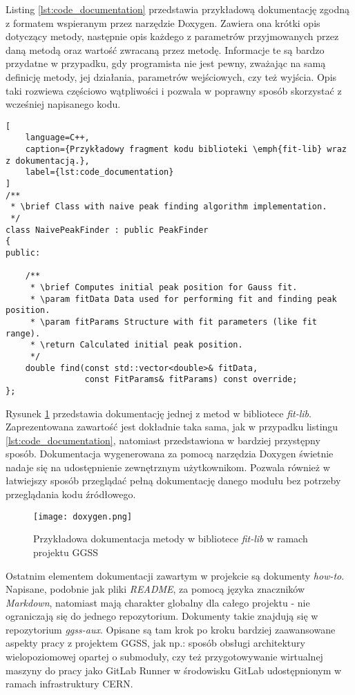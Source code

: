 Listing \ref{lst:code_documentation} przedstawia przykładową dokumentację zgodną z formatem wspieranym przez narzędzie Doxygen. Zawiera ona krótki opis dotyczący metody, następnie opis każdego z parametrów przyjmowanych przez daną metodą oraz wartość zwracaną przez metodę. Informacje te są bardzo przydatne w przypadku, gdy programista nie jest pewny, zważając na samą definicję metody, jej działania, parametrów wejściowych, czy też wyjścia. Opis taki rozwiewa częściowo wątpliwości i pozwala w poprawny sposób skorzystać z wcześniej napisanego kodu.

\begin{lstlisting}[
    language=C++,
    caption={Przykładowy fragment kodu biblioteki \emph{fit-lib} wraz z dokumentacją.},
    label={lst:code_documentation}
]
/**
 * \brief Class with naive peak finding algorithm implementation.
 */
class NaivePeakFinder : public PeakFinder
{
public:

    /**
     * \brief Computes initial peak position for Gauss fit.
     * \param fitData Data used for performing fit and finding peak position.
     * \param fitParams Structure with fit parameters (like fit range).
     * \return Calculated initial peak position.
     */
    double find(const std::vector<double>& fitData,
                const FitParams& fitParams) const override;
};
\end{lstlisting}

Rysunek \ref{fig:doxygen} przedstawia dokumentację jednej z metod w bibliotece \emph{fit-lib}. Zaprezentowana zawartość jest dokładnie taka sama, jak w przypadku listingu \ref{lst:code_documentation}, natomiast przedstawiona w bardziej przystępny sposób. Dokumentacja wygenerowana za pomocą narzędzia Doxygen świetnie nadaje się na udostępnienie zewnętrznym użytkownikom. Pozwala również w łatwiejszy sposób przeglądać pełną dokumentację danego modułu bez potrzeby przeglądania kodu źródłowego.

\begin{figure}[H]
    \centering
    \texttt{[image: doxygen.png]}
    \caption{Przykładowa dokumentacja metody w bibliotece \emph{fit-lib} w ramach projektu GGSS}
    \label{fig:doxygen}
\end{figure}

Ostatnim elementem dokumentacji zawartym w projekcie są dokumenty \emph{how-to}. Napisane, podobnie jak pliki \emph{README}, za pomocą języka znaczników \emph{Markdown}, natomiast mają charakter globalny dla całego projektu - nie ograniczają się do jednego repozytorium. Dokumenty takie znajdują się w repozytorium \emph{ggss-aux}. Opisane są tam krok po kroku bardziej zaawansowane aspekty pracy z projektem GGSS, jak np.: sposób obsługi architektury wielopoziomowej opartej o submoduły, czy też przygotowywanie wirtualnej maszyny do pracy jako GitLab Runner w środowisku GitLab udostępnionym w ramach infrastruktury CERN.

